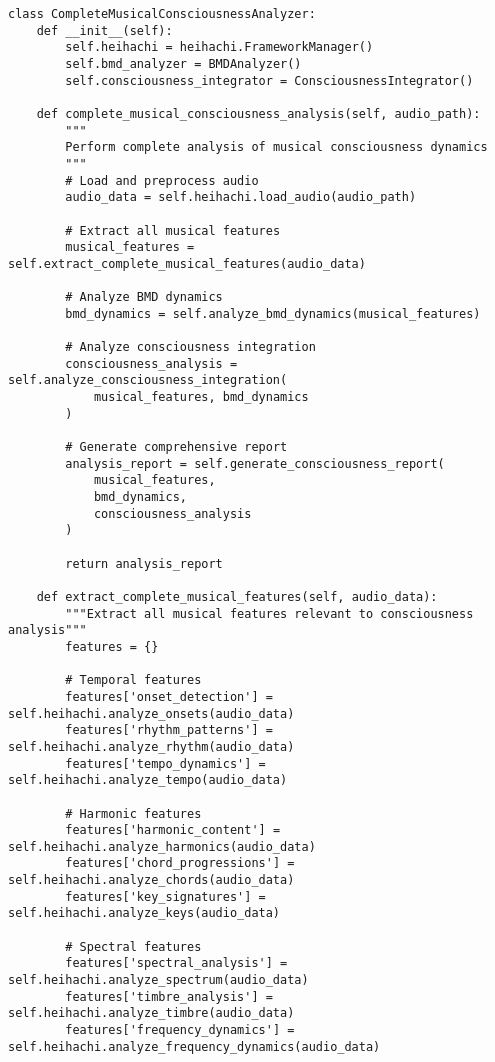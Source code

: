 \documentclass[12pt,a4paper]{article}
\begin{document}
\begin{lstlisting}[style=pythonstyle, caption=Complete Musical Consciousness Analysis]
class CompleteMusicalConsciousnessAnalyzer:
    def __init__(self):
        self.heihachi = heihachi.FrameworkManager()
        self.bmd_analyzer = BMDAnalyzer()
        self.consciousness_integrator = ConsciousnessIntegrator()
        
    def complete_musical_consciousness_analysis(self, audio_path):
        """
        Perform complete analysis of musical consciousness dynamics
        """
        # Load and preprocess audio
        audio_data = self.heihachi.load_audio(audio_path)
        
        # Extract all musical features
        musical_features = self.extract_complete_musical_features(audio_data)
        
        # Analyze BMD dynamics
        bmd_dynamics = self.analyze_bmd_dynamics(musical_features)
        
        # Analyze consciousness integration
        consciousness_analysis = self.analyze_consciousness_integration(
            musical_features, bmd_dynamics
        )
        
        # Generate comprehensive report
        analysis_report = self.generate_consciousness_report(
            musical_features,
            bmd_dynamics,
            consciousness_analysis
        )
        
        return analysis_report
    
    def extract_complete_musical_features(self, audio_data):
        """Extract all musical features relevant to consciousness analysis"""
        features = {}
        
        # Temporal features
        features['onset_detection'] = self.heihachi.analyze_onsets(audio_data)
        features['rhythm_patterns'] = self.heihachi.analyze_rhythm(audio_data)
        features['tempo_dynamics'] = self.heihachi.analyze_tempo(audio_data)
        
        # Harmonic features  
        features['harmonic_content'] = self.heihachi.analyze_harmonics(audio_data)
        features['chord_progressions'] = self.heihachi.analyze_chords(audio_data)
        features['key_signatures'] = self.heihachi.analyze_keys(audio_data)
        
        # Spectral features
        features['spectral_analysis'] = self.heihachi.analyze_spectrum(audio_data)
        features['timbre_analysis'] = self.heihachi.analyze_timbre(audio_data)
        features['frequency_dynamics'] = self.heihachi.analyze_frequency_dynamics(audio_data)
        

\end{lstlisting}
\end{document}

